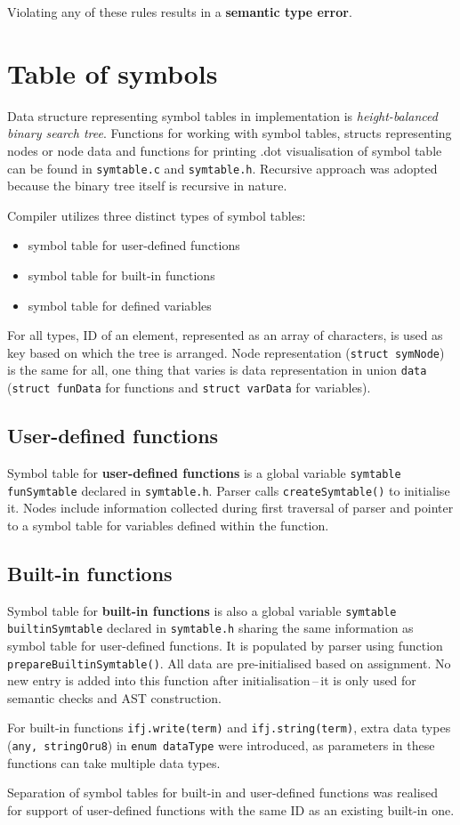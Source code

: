 \documentclass[a4paper, 11pt]{article}
\begin{document}
Violating any of these rules results in a \textbf{semantic type error}.


\section{Table of symbols}\label{sec:SYMTABLE}
Data structure representing symbol tables in implementation is \textit{height-balanced binary search tree}.
Functions for working with symbol tables, structs representing nodes or node data and functions for printing
.dot visualisation of symbol table can be found in \verb|symtable.c| and \verb|symtable.h|. Recursive approach was adopted because the binary tree itself is recursive in nature.
\par
Compiler utilizes three distinct types of symbol tables: 
\begin{itemize}
    \item symbol table for user-defined functions
    \item symbol table for built-in functions
    \item symbol table for defined variables
\end{itemize}
 For all types, ID of an element, represented as
an array of characters, is used as key based on which the tree is arranged. Node representation (\verb|struct symNode|) is the same for all, one thing that varies
is data representation in union \verb|data| (\verb|struct funData| for functions and \verb|struct varData| for variables).
\subsection{User-defined functions}
Symbol table for \textbf{user-defined functions} is a global variable \verb|symtable funSymtable| declared in \newline\verb|symtable.h|. Parser calls
\verb|createSymtable()| to initialise it. Nodes include information collected during first traversal of parser and pointer 
to a symbol table for variables defined within the function.
\subsection{Built-in functions}
Symbol table for \textbf{built-in functions} is also a global variable \verb|symtable builtinSymtable| declared in \verb|symtable.h| sharing
the same information as symbol table for user-defined functions. It is populated by parser using function \verb|prepareBuiltinSymtable()|.
All data are pre-initialised based on assignment. No new entry is added into this function after initialisation\,--\,it is only used
for semantic checks and AST construction. 
\par For built-in functions \verb|ifj.write(term)| and \verb|ifj.string(term)|, extra
data types (\verb|any, stringOru8|) in \verb|enum dataType| were introduced, as parameters in these functions can take multiple data types. 
\par Separation of symbol tables for built-in and user-defined functions was realised for support of user-defined functions with the same ID as an existing built-in one.
\end{document}
